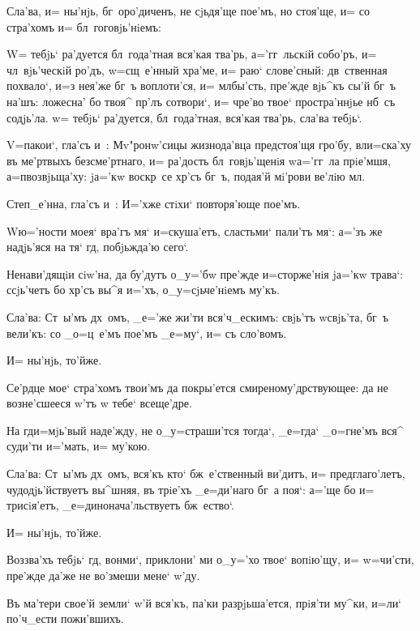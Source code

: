 Сла'ва, и= ны'нjь, бг~оро'диченъ, не сjьдя'ще пое'мъ, 
но стоя'ще, и= со стра'хомъ и= бл~гоговjь'нiемъ:

W= тебjь` ра'дуется бл~года'тная вся'кая тва'рь, 
а='гг~льскiй собо'ръ, и= чл~вjь'ческiй ро'дъ, w=сщ~е'нный 
хра'ме, и= раю` слове'сный: дв~ственная похвало`, и=з\ъ 
нея'же бг~ъ воплоти'ся, и= мл бы'сть, пре'жде 
вjь^къ сы'й бг~ъ на'шъ: ложесна' бо твоя^ пр'лъ 
сотвори`, и= чре'во твое` простра'ннjье нб~съ содjь'ла. 
w= тебjь` ра'дуется, бл~года'тная, вся'кая тва'рь, сла'ва 
тебjь`.

V=пакои`, гла'съ и~: Мv"ронw'сицы жизнода'вца 
предстоя'щя гро'бу, вл и=ска'ху въ ме'ртвыхъ 
безсме'ртнаго, и= ра'дость бл~говjь'щенiя w\т а='гг~ла 
прiе'мшя, а=п возвjьща'ху: jа='кw воскр~се 
хр'съ бг~ъ, подая'й мi'рови ве'лiю мл.

Степ_е'нна, гла'съ и~: И='хже стiхи` повторя'юще 
пое'мъ.


W\т ю='ности моея` вра'гъ мя` и=скуша'етъ, сластьми` 
пали'тъ мя`: а='зъ же надjь'яся на тя` гд, побjьжда'ю 
сего`.

Ненави'дящiи сiw'на, да бу'дутъ о_у='бw пре'жде 
и=сторже'нiя jа='кw трава`: ссjь'четъ бо хр'съ вы^я 
и='хъ, о_у=сjьче'нiемъ му'къ.

Сла'ва: Ст~ы'мъ дх~омъ, _е='же жи'ти вся'ч_ескимъ: 
свjь'тъ w\т свjь'та, бг~ъ вели'къ: со _о=ц~е'мъ пое'мъ 
_е=му`, и= съ сло'вомъ.

И= ны'нjь, то'йже.


Се'рдце мое` стра'хомъ твои'мъ да покры'ется 
смиреному'дрствующее: да не возне'сшееся w'тъ w\т 
тебе` всеще'дре.

На гд и=мjь'вый наде'жду, не о_у=страши'тся тогда`, 
_е=гда` _о=гне'мъ вся^ суди'ти и='мать, и= му'кою.

Сла'ва: Ст~ы'мъ дх~омъ, вся'къ кто` бж~е'ственный 
ви'дитъ, и= предглаго'летъ, чудодjь'йствуетъ вы^шняя, въ 
трiе'хъ _е=ди'наго бг~а поя`: а='ще бо и= трисiя'етъ, 
_е=динонача'льствуетъ бж~ество`.

И= ны'нjь, то'йже.


Воззва'хъ тебjь` гд, вонми`, приклони' ми о_у='хо 
твое` вопiю'щу, и= w=чи'сти, пре'жде да'же не во'змеши 
мене` w'ду.

Въ ма'тери свое'й земли` w'й вся'къ, па'ки 
разрjьша'ется, прiя'ти му^ки, и=ли` по'ч_ести пожи'вшихъ.


